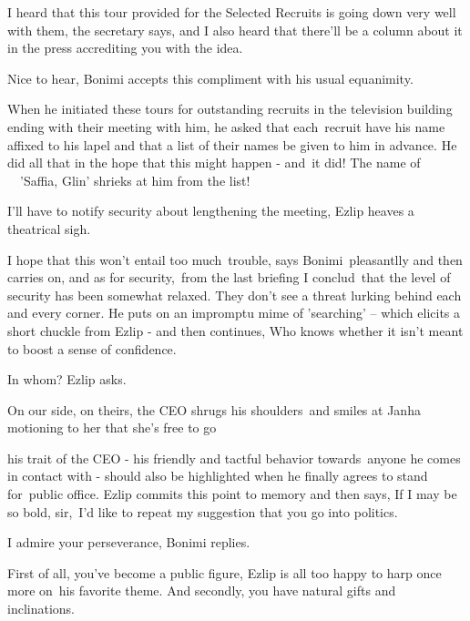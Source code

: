 \documentclass[letterpaper]{article}
\begin{document}
{\textquotedbl}I heard that this tour provided for the Selected Recruits is going down very well with
them,{\textquotedbl} the secretary says, {\textquotedbl}and I also heard that there'll be a column about it in the
press accrediting you with the idea.{\textquotedbl}

{\textquotedbl}Nice to hear,{\textquotedbl} Bonimi accepts this compliment with his usual equanimity. 

When he initiated these tours for outstanding recruits in the television building ending with their meeting with him, he
asked that each\ recruit have his name affixed to his lapel and that a list of their names be given to him in advance.
He did all that in the hope that this might  happen - and\textcolor[rgb]{0.0,0.4392157,0.7529412}{\ }it did! The name
of ~~{}'Saffia, Glin' shrieks at him from the list!\ 

{\textquotedbl}I'll have to notify security about lengthening the meeting,{\textquotedbl} Ezlip heaves a theatrical
sigh. 

{\textquotedbl}I hope that this won't entail too much~trouble,{\textquotedbl} says Bonimi\ pleasantlly and then carries
on, {\textquotedbl}and as for security,\ from the last briefing I conclud\textit{\ }that the level of security has been
somewhat relaxed. They don't see a threat lurking behind each and every corner.{\textquotedbl} He puts on an impromptu
mime of {}'searching{}' -- which elicits a short chuckle from Ezlip - and then continues, {\textquotedbl}Who knows
whether it isn't meant to boost a sense of confidence.{\textquotedbl} 

{\textquotedbl}In whom?{\textquotedbl} Ezlip asks. 

{\textquotedbl}On our side, on theirs,{\textquotedbl} the CEO shrugs his shoulders\ and smiles at Janha motioning to her
that she's free to go 

his trait of the CEO - his friendly and tactful behavior towards\ anyone he comes in contact with - should also be
highlighted when he finally agrees to stand for~public office.  Ezlip commits this point to memory and then says,
{\textquotedbl}If I may be so bold, sir,\ I'd like to repeat my suggestion that you go into politics.{\textquotedbl} 

{\textquotedbl}I admire your perseverance,{\textquotedbl} Bonimi replies. 

{\textquotedbl}First of all, you{}'ve become a public figure,{\textquotedbl} Ezlip is all too happy to harp once more
on\ his favorite theme. {\textquotedbl}And secondly, you have natural gifts and inclinations.{\textquotedbl}
\end{document}
